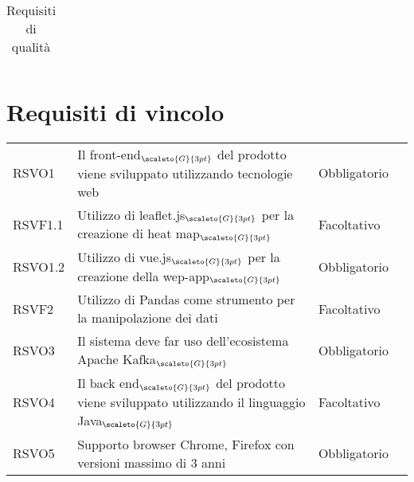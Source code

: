 {{{\begin{center}
\begin{longtable}{|p{4cm}|p{4cm}|p{4cm}|p{3cm}|}
		\caption[Requisiti di qualità]{Requisiti di qualità}\label{4.3}\\
		\end{longtable}
\end{center}

\section{Requisiti di vincolo}\label{RequisitiDiVincolo}
\def\tabularxcolumn#1{m{#1}}
{

\begin{center}
	\renewcommand{\arraystretch}{1.4}
	\begin{longtable}{|p{2.5cm}|p{4.5cm}|p{3.5cm}|p{4cm}|}
		\hline
		\rowcolor{airforceblue}
		\makecell[c]{\textbf{Codice RS}} & \makecell[c]{\textbf{Descrizione}} & \makecell[c]{\textbf{Tipo di requisito}} & \makecell[c]{\textbf{Fonte}} \\
		\hline
		\centering RSVO1  & Il front-end$_{\scaleto{G}{3pt}}$ del prodotto viene sviluppato utilizzando tecnologie web &\centering Obbligatorio  & \makecell[tc]{Capitolato$_{\scaleto{G}{3pt}}$} \\
		\hline
		\centering RSVF1.1  & Utilizzo di leaflet.js$_{\scaleto{G}{3pt}}$ per la creazione di heat map$_{\scaleto{G}{3pt}}$ &\centering  Facoltativo & \makecell[tc]{Capitolato$_{\scaleto{G}{3pt}}$} \\
		\hline
		\centering RSVO1.2  & Utilizzo di vue.js$_{\scaleto{G}{3pt}}$ per la creazione della wep-app$_{\scaleto{G}{3pt}}$  &\centering  Obbligatorio  & \makecell[tc]{V. esterno 02-02-2021} \\
		\hline
		\centering RSVF2 & Utilizzo di Pandas come strumento per la manipolazione dei dati & \centering Facoltativo & \makecell[tc]{V. esterno 02-02-2021} \\
		\hline
		\centering RSVO3  & Il sistema deve far uso dell'ecosistema Apache Kafka$_{\scaleto{G}{3pt}}$ &\centering  Obbligatorio  & \makecell[tc]{Capitolato$_{\scaleto{G}{3pt}}$} \\
		\hline
		\centering RSVO4  & Il back end$_{\scaleto{G}{3pt}}$ del prodotto viene sviluppato utilizzando il linguaggio Java$_{\scaleto{G}{3pt}}$ &\centering  Facoltativo  & \makecell[tc]{Capitolato$_{\scaleto{G}{3pt}}$} \\
		\hline
		\centering RSVO5  & Supporto browser Chrome, Firefox con versioni massimo di 3 anni &\centering  Obbligatorio  & \makecell[tc]{Interno} \\

\end{longtable}
\end{center}}}}}
